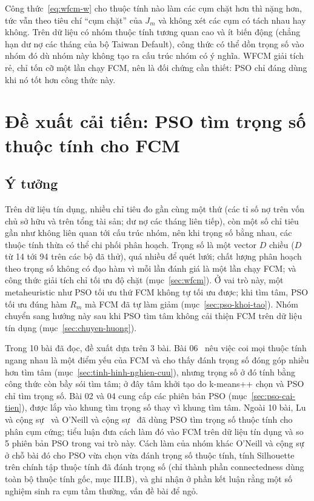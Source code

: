 Công thức~\eqref{eq:wfcm-w} cho thuộc tính nào làm các cụm chặt hơn thì nặng hơn, tức vẫn theo tiêu chí ``cụm chặt'' của
$J_m$ và không xét các cụm có tách nhau hay không. Trên dữ liệu có nhóm thuộc tính tương quan cao và ít biến động (chẳng hạn dư nợ các
tháng của bộ Taiwan Default), công thức có thể dồn trọng số vào nhóm đó dù nhóm này không tạo ra cấu trúc nhóm có ý nghĩa.
WFCM giải tích rẻ, chỉ tốn cỡ một lần chạy FCM, nên là đối chứng cần thiết: PSO chỉ đáng dùng khi nó tốt hơn công thức này.

\section{Đề xuất cải tiến: PSO tìm trọng số thuộc tính cho FCM}
\label{sec:pso-trong-so-pp}
\label{sec:de-xuat}

\subsection{Ý tưởng}

Trên dữ liệu tín dụng, nhiều chỉ tiêu đo gần cùng một thứ (các tỉ số nợ trên vốn chủ sở hữu và trên tổng tài sản; dư nợ
các tháng liên tiếp), còn một số chỉ tiêu gần như không liên quan tới cấu trúc nhóm, nên khi trọng số bằng nhau, các thuộc tính
thừa có thể chi phối phân hoạch. Trọng số là một vector $D$ chiều ($D$ từ 14 tới 94 trên các bộ đã thử), quá
nhiều để quét lưới; chất lượng phân hoạch theo trọng số không có đạo hàm vì mỗi lần đánh giá là một lần chạy FCM; và công
thức giải tích chỉ tối ưu độ chặt (mục~\ref{sec:wfcm}). Ở vai trò này, một metaheuristic như PSO tối ưu thứ FCM không tự
tối ưu được; khi tìm tâm, PSO tối ưu đúng hàm $R_m$ mà FCM đã tự làm giảm (mục~\ref{sec:pso-khoi-tao}). Nhóm chuyển sang
hướng này sau khi PSO tìm tâm không cải thiện FCM trên dữ liệu tín dụng (mục~\ref{sec:chuyen-huong}).

Trong 10 bài đã đọc, đề xuất dựa trên 3 bài. Bài 06~\cite{liu2021msgwo} nêu việc coi mọi thuộc tính ngang nhau là một điểm
yếu của FCM và cho thấy đánh trọng số đóng góp nhiều hơn tìm tâm (mục~\ref{sec:tinh-hinh-nghien-cuu}), nhưng trọng số ở đó tính
bằng công thức còn bầy sói tìm tâm; ở đây tâm khởi tạo do k-means++ chọn và PSO chỉ tìm trọng số. Bài 02 và 04 cung cấp
các phiên bản PSO (mục~\ref{sec:pso-cai-tien}), được lắp vào khung tìm trọng số thay vì khung tìm tâm. Ngoài 10 bài, Lu
và cộng sự~\cite{lu2011psovw} và O'Neill và cộng sự~\cite{oneill2018psofw} đã dùng PSO tìm trọng số thuộc tính cho phân cụm
cứng; tiểu luận đưa cách làm đó vào FCM trên dữ liệu tín dụng và so 5 phiên bản PSO trong vai trò này. Cách làm của nhóm khác O'Neill và cộng sự ở chỗ bài đó cho PSO
vừa chọn vừa đánh trọng số thuộc tính, tính Silhouette trên chính tập thuộc tính đã đánh trọng số (chỉ thành phần connectedness dùng toàn bộ
thuộc tính gốc, mục III.B), và ghi nhận ở phần kết luận rằng một số nghiệm sinh ra cụm tầm thường, vấn đề bài để ngỏ.

